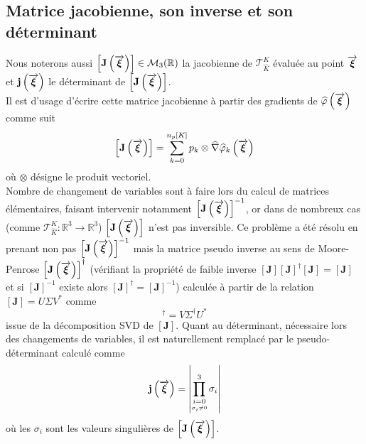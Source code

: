 \subsection{Matrice jacobienne, son inverse et son déterminant}
\noindent Nous noterons aussi $\left[\mathbf{J}\left(\overrightarrow{\boldsymbol{\xi}}\right)\right]\in \mathcal{M}_3(\mathbb{R})$ la jacobienne de $\mathcal{T}_{\hat{K}}^{K}$ évaluée au point $\overrightarrow{\boldsymbol{\xi}}$ et $\mathbf{j}\left(\overrightarrow{\boldsymbol{\xi}}\right)$ le déterminant de $\left[\mathbf{J}\left(\overrightarrow{\boldsymbol{\xi}}\right)\right]$.\\
Il est d'usage d'écrire cette matrice jacobienne à partir des gradients de $\widehat{\varphi}\left(\overrightarrow{\boldsymbol{\xi}}\right)$ comme suit
\begin{equation}
	\left[\mathbf{J}\left(\overrightarrow{\boldsymbol{\xi}}\right)\right] = \sum_{k=0}^{n_p[K]} p_k \otimes \widehat{\nabla}\widehat{\varphi}_k\left(\overrightarrow{\boldsymbol{{\xi}}}\right)
\end{equation}
où $\otimes$ désigne le produit vectoriel.\\

\noindent Nombre de changement de variables sont à faire lors du calcul de matrices élémentaires, faisant intervenir notamment $\left[\mathbf{J}\left(\overrightarrow{\boldsymbol{\xi}}\right)\right]^{-1}$, or dans de nombreux cas (comme $\mathcal{T}_{\hat{K}}^{K}  : \mathbb{R}^3 \to \mathbb{R}^3$) $\left[\mathbf{J}\left(\overrightarrow{\boldsymbol{\xi}}\right)\right]$ n'est pas inversible. Ce problème a été résolu en prenant non pas $\left[\mathbf{J}\left(\overrightarrow{\boldsymbol{\xi}}\right)\right]^{-1}$ mais la matrice pseudo inverse au sens de Moore-Penrose $\left[\mathbf{J}\left(\overrightarrow{\boldsymbol{\xi}}\right)\right]^{\dagger}$ (vérifiant la propriété de faible inverse $[\mathbf{J}][\mathbf{J}]^{\dagger} [\mathbf{J}] = [\mathbf{J}]$ et si $[\mathbf{J}]^{-1}$ existe alors $[\mathbf{J}]^{\dagger}=[\mathbf{J}]^{-1}$) calculée à partir de la relation $[\mathbf{J}] = U\Sigma V^{*}$ comme 
\begin{equation}
[\mathbf{J}]^{\dagger} = V\Sigma^{\dagger}U^{*}
\end{equation}
issue de la décomposition SVD de $[\mathbf{J}]$. Quant au  déterminant, nécessaire lors des changements de variables, il est naturellement remplacé par le pseudo-déterminant calculé comme \begin{equation}
	\mathbf{j}\left(\overrightarrow{\boldsymbol{\xi}}\right) = \left|\prod_{\underset{\sigma_i \neq 0}{i=0}}^{3}\sigma_i\right|
\end{equation}
où les $\sigma_i$ sont les valeurs singulières de $\left[\mathbf{J}\left(\overrightarrow{\boldsymbol{\xi}}\right)\right]$.\\

